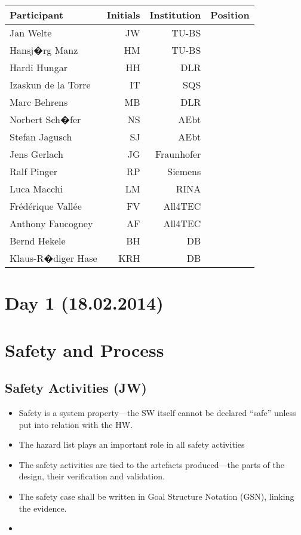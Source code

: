 \documentclass[a4paper,german]{article}
\begin{document}
\begin{tabular}{|l|r|r|l|}
  \hline
\textbf{Participant} & \textbf{Initials} & \textbf{Institution} & \textbf{Position}
\\\hline
Jan Welte & JW &TU-BS &
\\\hline
Hansj�rg Manz & HM & TU-BS &
\\\hline
Hardi Hungar & HH & DLR &
\\\hline
Izaskun de la Torre & IT & SQS & 
\\\hline
Marc Behrens & MB & DLR &
\\\hline
Norbert Sch�fer& NS & AEbt &
\\\hline
Stefan Jagusch & SJ & AEbt &
\\\hline
Jens Gerlach & JG & Fraunhofer &
\\\hline
Ralf Pinger & RP & Siemens &
\\\hline
Luca Macchi & LM & RINA &
\\\hline
Fr\'ed\'erique Vall\'ee & FV & All4TEC &
\\\hline
Anthony Faucogney & AF &All4TEC &
\\\hline
Bernd Hekele & BH & DB &
\\\hline 
Klaus-R�diger Hase & KRH & DB &
\\\hline
\end{tabular}

\section*{Day 1 (18.02.2014)}
\label{sec:day-1-18.02.2014}

\section{Safety and Process}
\label{sec:safety-process}

\subsection{Safety Activities (JW)}
\label{sec:safety-activ-jan}

\begin{itemize}
\item Safety is a system property---the SW itself cannot be declared
  ``safe'' unless put into relation with the HW.
\item The hazard list plays an important role in all safety activities 
\item The safety activities are tied to the artefacts produced---the
  parts of the design, their verification and validation.
\item The safety case shall be written in Goal Structure Notation
  (GSN), linking the evidence.
\item 
\end{itemize}
\end{document}
